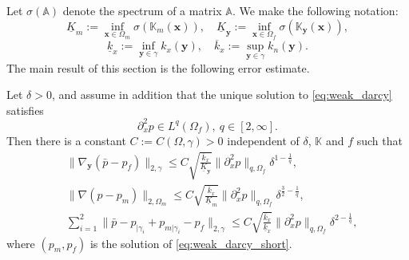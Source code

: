 \documentclass{llncs}
\def\vc#1{\mathbf{\boldsymbol{#1}}}     %
\def\tn#1{{\mathbb{#1}}}    %
\def\norm#1{\|#1\|}
\def\yy{{\vc y}}
\begin{document}


Let $\sigma(\tn A)$ denote the spectrum of a matrix $\tn A$.
We make the following notation:
\[ \underline K_m := \inf_{\vc x\in\Omega_m}\sigma(\tn K_m(\vc x)), \quad \underline K_\yy := \inf_{\vc x\in\Omega_f}\sigma(\tn K_\yy(\vc x)), \]
\[ \underline k_x := \inf_{\yy\in\gamma}k_x(\yy), \quad \overline k_x:=\sup_{\yy\in\gamma}k_n(\yy). \]
The main result of this section is the following error estimate.
\begin{theorem}
\label{th:error_estimate}
Let $\delta>0$, and assume in addition that the unique solution to \eqref{eq:weak_darcy} satisfies
\[ \partial_x^2 p\in L^q(\Omega_f), ~q\in[2,\infty]. \]
Then there is a constant $C:=C(\Omega,\gamma)>0$ independent of $\delta$, $\tn K$ and $f$ such that
\begin{subequations}
\label{eq:error_estimates_delta}
\begin{align}
&\norm{\nabla_\yy(\bar p - p_f)}_{2,\gamma} \le C\sqrt{\frac{\overline k_x}{\underline K_\yy}}\norm{\partial_x^2 p}_{q,\Omega_f}\delta^{1-\frac1q},\\
&\norm{\nabla(p-p_m)}_{2,\Omega_m} \le C\sqrt{\frac{\overline k_x}{\underline K_m}}\norm{\partial_x^2 p}_{q,\Omega_f}\delta^{\frac32-\frac1q},\\
&\sum_{i=1}^2\norm{\bar p-p_{|\gamma_i}+p_{m|\gamma_i}-p_f}_{2,\gamma} \le C\sqrt{\frac{\overline k_x}{\underline k_x}}\norm{\partial_x^2 p}_{q,\Omega_f}\delta^{2-\frac1q},
\end{align}
\end{subequations}
where $(p_m,p_f)$ is the solution of \eqref{eq:weak_darcy_short}.
\end{theorem}
\end{document}
